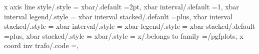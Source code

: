 x axis line style/.style                                           ={                                                                                                                                  
xbar/.default                                                      =2pt,                                                                                                                               
xbar interval/.default                                             =1,                                                                                                                                 
xbar interval legend/.style                                        ={%
xbar interval stacked/.default                                     =plus,                                                                                                                              
xbar interval stacked/.style                                       ={                                                                                                                                  
xbar interval/.style                                               ={%
xbar legend/.style                                                 ={                                                                                                                                  
xbar stacked/.default                                              =plus,                                                                                                                              
xbar stacked/.style                                                ={                                                                                                                                  
xbar/.style                                                        ={                                                                                                                                  
x/.belongs to family                                               =/pgfplots,                                                                                                                         
x coord inv trafo/.code                                            ={},                                                                                                                                
}}}}}}}

